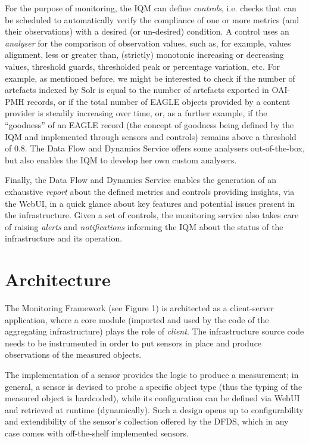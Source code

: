 \documentclass[amsthm,ebook]{saparticle}
\begin{document}
\vspace{5pt}
For the purpose of monitoring, the IQM can define \textit{controls}, i.e. checks that can be scheduled to automatically verify the compliance of one or more metrics (and their observations) with a desired (or un-desired) condition. A control uses an \textit{analyser} for the comparison of observation values, such as, for example, values alignment, less or greater than, (strictly) monotonic increasing or decreasing values, threshold guards, thresholded peak or percentage variation, etc. For example, as mentioned before, we might be interested to check if the number of artefacts indexed by Solr is equal to the number of artefacts exported in OAI-PMH records, or if the total number of EAGLE objects provided by a content provider is steadily increasing over time, or, as a further example, if the ``goodness'' of an EAGLE record (the concept of goodness being defined by the IQM and implemented through sensors and controls) remains above a threshold of 0.8. The Data Flow and Dynamics Service offers some analysers out-of-the-box, but also enables the IQM to develop her own custom analysers.

\vspace{5pt}
Finally, the Data Flow and Dynamics Service enables the generation of an exhaustive \textit{report} about the defined metrics and controls providing insights, via the WebUI, in a quick glance about key features and potential issues present in the infrastructure. Given a set of controls, the monitoring service also takes care of raising \textit{alerts} and \textit{notifications} informing the IQM about the status of the infrastructure and its operation.

\vspace{5pt}
\section{Architecture}\label{arch}

\noindent The Monitoring Framework (see Figure 1) is architected as a client-server application, where a core module (imported and used by the code of the aggregating infrastructure) plays the role of \textit{client}. The infrastructure source code needs to be instrumented in order to put sensors in place and produce observations of the measured objects.

\vspace{5pt}
The implementation of a sensor provides the logic to produce a measurement; in general, a sensor is devised to probe a specific object type (thus the typing of the measured object is hardcoded), while its configuration can be defined via WebUI and retrieved at runtime (dynamically). Such a design opens up to configurability and extendibility of the sensor’s collection offered by the DFDS, which in any case comes with off-the-shelf implemented sensors.
\end{document}
